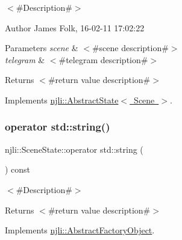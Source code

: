 $<$\#\+Description\#$>$ 

\begin{DoxyAuthor}{Author}
James Folk, 16-\/02-\/11 17\+:02\+:22
\end{DoxyAuthor}

\begin{DoxyParams}{Parameters}
{\em scene} & $<$\#scene description\#$>$ \\
\hline
{\em telegram} & $<$\#telegram description\#$>$\\
\hline
\end{DoxyParams}
\begin{DoxyReturn}{Returns}
$<$\#return value description\#$>$ 
\end{DoxyReturn}


Implements \mbox{\hyperlink{classnjli_1_1_abstract_state_aa486b2e60e57d789855acdfb555a4cdc}{njli\+::\+Abstract\+State$<$ Scene $>$}}.

\mbox{\label{classnjli_1_1_scene_state_ac1daf5f9a9bba0a4700f8fa75d7b488b}} 
\subsubsection{\texorpdfstring{operator std\+::string()}{operator std::string()}}
{\footnotesize\ttfamily njli\+::\+Scene\+State\+::operator std\+::string (\begin{DoxyParamCaption}{ }\end{DoxyParamCaption}) const\hspace{0.3cm}{\ttfamily [virtual]}}

$<$\#\+Description\#$>$

\begin{DoxyReturn}{Returns}
$<$\#return value description\#$>$ 
\end{DoxyReturn}


Implements \mbox{\hyperlink{classnjli_1_1_abstract_factory_object_a838f4fa7e65cace6098aab5222892942}{njli\+::\+Abstract\+Factory\+Object}}.

\mbox{\label{classnjli_1_1_scene_state_a7ff08f27f08190fe52c335c6955582ac}} 
